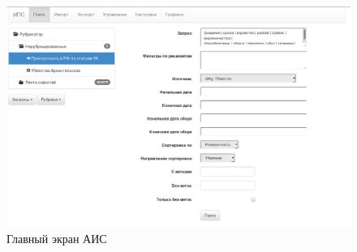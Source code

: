   \begin{figure}[h!]
  \centering
  \includegraphics[width=0.9\linewidth]{technology/gui_main}
  \caption{Главный экран АИС}
  \label{figure:guiMain}
  \end{figure}

